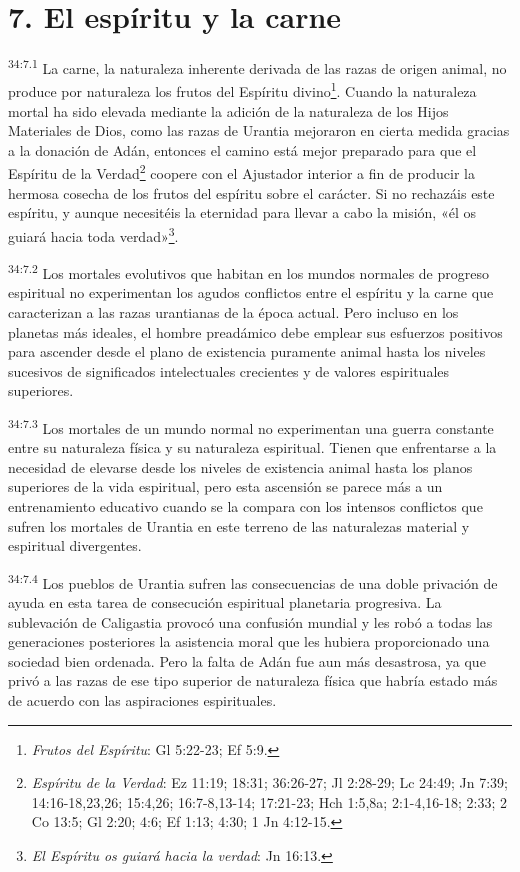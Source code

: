 \section*{7. El espíritu y la carne}
\par
\textsuperscript{34:7.1} La carne, la naturaleza inherente derivada de las razas de origen animal, no produce por naturaleza los frutos del Espíritu divino\footnote{\textit{Frutos del Espíritu}: Gl 5:22-23; Ef 5:9.}. Cuando la naturaleza mortal ha sido elevada mediante la adición de la naturaleza de los Hijos Materiales de Dios, como las razas de Urantia mejoraron en cierta medida gracias a la donación de Adán, entonces el camino está mejor preparado para que el Espíritu de la Verdad\footnote{\textit{Espíritu de la Verdad}: Ez 11:19; 18:31; 36:26-27; Jl 2:28-29; Lc 24:49; Jn 7:39; 14:16-18,23,26; 15:4,26; 16:7-8,13-14; 17:21-23; Hch 1:5,8a; 2:1-4,16-18; 2:33; 2 Co 13:5; Gl 2:20; 4:6; Ef 1:13; 4:30; 1 Jn 4:12-15.} coopere con el Ajustador interior a fin de producir la hermosa cosecha de los frutos del espíritu sobre el carácter. Si no rechazáis este espíritu, y aunque necesitéis la eternidad para llevar a cabo la misión, «él os guiará hacia toda verdad»\footnote{\textit{El Espíritu os guiará hacia la verdad}: Jn 16:13.}.

\par
\textsuperscript{34:7.2} Los mortales evolutivos que habitan en los mundos normales de progreso espiritual no experimentan los agudos conflictos entre el espíritu y la carne que caracterizan a las razas urantianas de la época actual. Pero incluso en los planetas más ideales, el hombre preadámico debe emplear sus esfuerzos positivos para ascender desde el plano de existencia puramente animal hasta los niveles sucesivos de significados intelectuales crecientes y de valores espirituales superiores.

\par
\textsuperscript{34:7.3} Los mortales de un mundo normal no experimentan una guerra constante entre su naturaleza física y su naturaleza espiritual. Tienen que enfrentarse a la necesidad de elevarse desde los niveles de existencia animal hasta los planos superiores de la vida espiritual, pero esta ascensión se parece más a un entrenamiento educativo cuando se la compara con los intensos conflictos que sufren los mortales de Urantia en este terreno de las naturalezas material y espiritual divergentes.

\par
\textsuperscript{34:7.4} Los pueblos de Urantia sufren las consecuencias de una doble privación de ayuda en esta tarea de consecución espiritual planetaria progresiva. La sublevación de Caligastia provocó una confusión mundial y les robó a todas las generaciones posteriores la asistencia moral que les hubiera proporcionado una sociedad bien ordenada. Pero la falta de Adán fue aun más desastrosa, ya que privó a las razas de ese tipo superior de naturaleza física que habría estado más de acuerdo con las aspiraciones espirituales.

